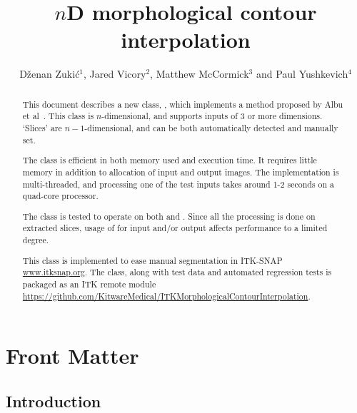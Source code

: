 \documentclass{InsightArticle}
\title{$n$D morphological contour interpolation}
\author{D{\v z}enan Zuki{\' c}$^{1}$, Jared Vicory$^{2}$, Matthew McCormick$^{3}$ and Paul Yushkevich$^{4}$}
\newcommand{\IJhandlerIDnumber}{1338}
\begin{document}
\IJhandlefooter{\IJhandlerIDnumber}

\ifpdf
\else
\fi

\maketitle

\ifhtml
\chapter*{Front Matter\label{front}}
\fi


\begin{abstract}
\noindent
This document describes a new class, ,
which implements a method proposed by Albu et al~\cite{Albu2008}.
This class is $n$-dimensional, and supports inputs of 3 or more dimensions.
`Slices' are $n-1$-dimensional, and can be both automatically detected and manually set.

The class is efficient in both memory used and execution time.
It requires little memory in addition to allocation of input and output images.
The implementation is multi-threaded, and processing one of the test inputs
takes around 1-2 seconds on a quad-core processor.

The class is tested to operate on both  and .
Since all the processing is done on extracted slices,
usage of  for input and/or output affects performance to a limited degree.

This class is implemented to ease manual segmentation in ITK-SNAP \url{www.itksnap.org}.
The class, along with test data and automated regression tests is packaged as an ITK
remote module \url{https://github.com/KitwareMedical/ITKMorphologicalContourInterpolation}.
\end{abstract}

\IJhandlenote{\IJhandlerIDnumber}

\tableofcontents


\section{Introduction}
\end{document}

